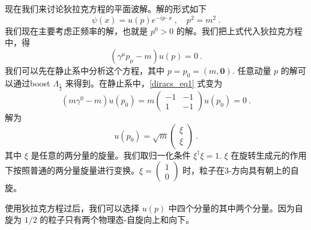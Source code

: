 
现在我们来讨论狄拉克方程的平面波解。解的形式如下
\begin{equation}
\psi(x) = u(p)e^{-ip\cdot x}~, \quad p^2 = m^2~.
\end{equation}
我们现在主要考虑正频率的解，也就是 $p^0>0$ 的解。我们把上式代入狄拉克方程中，得
\begin{equation}\label{diracs_eq1}
(\gamma^\mu p_\mu - m) u(p) = 0~.
\end{equation}
我们可以先在静止系中分析这个方程，其中 $p=p_0=(m,\boldsymbol 0 )$. 任意动量 $p$ 的解可以通过boost $\Lambda_{\frac{1}{2}}$ 来得到。在静止系中，\autoref{diracs_eq1} 式变为
\begin{equation}
(m\gamma^0-m)u(p_0) = m\begin{pmatrix}
-1 & -1 \\
 1 & -1
\end{pmatrix}u(p_0) = 0 ~.
\end{equation}
解为
\begin{equation}
u(p_0) = \sqrt{m} \begin{pmatrix}
\xi \\ \xi
\end{pmatrix}~.
\end{equation}
其中 $\xi$ 是任意的两分量的旋量。我们取归一化条件 $\xi^\dagger \xi =1$. $\xi$ 在旋转生成元的作用下按照普通的两分量旋量进行变换。$\xi = \begin{pmatrix}
1 \\0
\end{pmatrix}$ 时，粒子在3-方向具有朝上的自旋。

使用狄拉克方程过后，我们可以选择 $u(p)$ 中四个分量的其中两个分量。因为自旋为 $1/2$ 的粒子只有两个物理态-自旋向上和向下。

